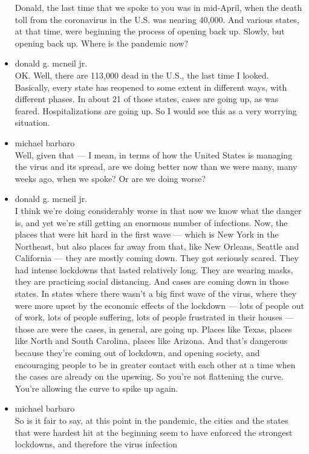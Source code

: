\begin{itemize}
  Donald, the last time that we spoke to you was in mid-April, when the
  death toll from the coronavirus in the U.S. was nearing 40,000. And
  various states, at that time, were beginning the process of opening
  back up. Slowly, but opening back up. Where is the pandemic now?
\item
  donald g. mcneil jr.\\
  OK. Well, there are 113,000 dead in the U.S., the last time I looked.
  Basically, every state has reopened to some extent in different ways,
  with different phases. In about 21 of those states, cases are going
  up, as was feared. Hospitalizations are going up. So I would see this
  as a very worrying situation.
\item
  michael barbaro\\
  Well, given that --- I mean, in terms of how the United States is
  managing the virus and its spread, are we doing better now than we
  were many, many weeks ago, when we spoke? Or are we doing worse?
\item
  donald g. mcneil jr.\\
  I think we're doing considerably worse in that now we know what the
  danger is, and yet we're still getting an enormous number of
  infections. Now, the places that were hit hard in the first wave ---
  which is New York in the Northeast, but also places far away from
  that, like New Orleans, Seattle and California --- they are mostly
  coming down. They got seriously scared. They had intense lockdowns
  that lasted relatively long. They are wearing masks, they are
  practicing social distancing. And cases are coming down in those
  states. In states where there wasn't a big first wave of the virus,
  where they were more upset by the economic effects of the lockdown ---
  lots of people out of work, lots of people suffering, lots of people
  frustrated in their houses --- those are were the cases, in general,
  are going up. Places like Texas, places like North and South Carolina,
  places like Arizona. And that's dangerous because they're coming out
  of lockdown, and opening society, and encouraging people to be in
  greater contact with each other at a time when the cases are already
  on the upswing. So you're not flattening the curve. You're allowing
  the curve to spike up again.
\item
  michael barbaro\\
  So is it fair to say, at this point in the pandemic, the cities and
  the states that were hardest hit at the beginning seem to have
  enforced the strongest lockdowns, and therefore the virus infection

\end{itemize}

